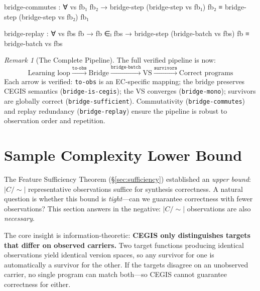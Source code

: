 \documentclass[9pt,a4paper]{article}
\theoremstyle{plain}
\theoremstyle{definition}
\theoremstyle{remark}
\newtheorem{remark}{Remark}
\begin{document}
\begin{spec}
      bridge-commutes : ∀ vs fb₁ fb₂ →
        bridge-step (bridge-step vs fb₁) fb₂
          ≡ bridge-step (bridge-step vs fb₂) fb₁
\end{spec}

\begin{spec}
      bridge-replay : ∀ vs fbs fb →
        fb ∈ₗ fbs →
        bridge-step (bridge-batch vs fbs) fb
          ≡ bridge-batch vs fbs
\end{spec}

\begin{remark}[The Complete Pipeline]
The full verified pipeline is now:
\[
\text{Learning loop} \xrightarrow{\texttt{to-obs}} \text{Bridge} \xrightarrow{\texttt{bridge-batch}} \text{VS} \xrightarrow{\texttt{survivors}} \text{Correct programs}
\]
Each arrow is verified: \texttt{to-obs} is an EC-specific mapping; the bridge preserves CEGIS semantics (\texttt{bridge-is-cegis}); the VS converges (\texttt{bridge-mono}); survivors are globally correct (\texttt{bridge-sufficient}).
Commutativity (\texttt{bridge-commutes}) and replay redundancy (\texttt{bridge-replay}) ensure the pipeline is robust to observation order and repetition.
\end{remark}



\section{Sample Complexity Lower Bound}
\label{sec:lower-bound}

The Feature Sufficiency Theorem (\S\ref{sec:sufficiency}) established an \emph{upper bound}: $|C/{\sim}|$ representative observations suffice for synthesis correctness.
A natural question is whether this bound is \emph{tight}---can we guarantee correctness with fewer observations?
This section answers in the negative: $|C/{\sim}|$ observations are also \emph{necessary}.

The core insight is information-theoretic: \textbf{CEGIS only distinguishes targets that differ on observed carriers.}
Two target functions producing identical observations yield identical version spaces, so any survivor for one is automatically a survivor for the other.
If the targets disagree on an unobserved carrier, no single program can match both---so CEGIS cannot guarantee correctness for either.
\end{document}
